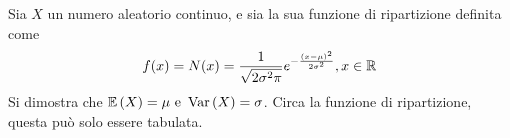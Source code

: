 \documentclass{subfiles}
\begin{document}
Sia \(X\) un numero aleatorio continuo, e sia la sua funzione di ripartizione definita come
\[
    f(x) = N(x) = \Frac{1}{\sqrt{2\sigma^{2}\pi}}e^{- \Frac{(x - \mu)^{2}}{2 \sigma^{2}}}   , x \in \Real
\]
Si dimostra che \(\Expected{X} = \mu \text{e} \Var{X} = \sigma\).
Circa la funzione di ripartizione, questa può solo essere tabulata\footnotemark[2].
\end{document}
